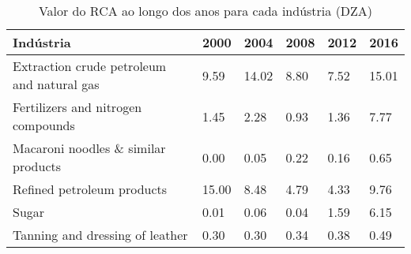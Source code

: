 \begin{table}
\centering
\caption{Valor do RCA ao longo dos anos para cada indústria (DZA)}
\begin{tabular}{p{6cm}p{1.5cm}p{1.5cm}p{1.5cm}p{1.5cm}p{1.5cm}}
\toprule
                                 Indústria &  2000 &  2004 & 2008 & 2012 &  2016 \\
\midrule
Extraction crude petroleum and natural gas &  9.59 & 14.02 & 8.80 & 7.52 & 15.01 \\
        Fertilizers and nitrogen compounds &  1.45 &  2.28 & 0.93 & 1.36 &  7.77 \\
       Macaroni noodles \& similar products &  0.00 &  0.05 & 0.22 & 0.16 &  0.65 \\
                Refined petroleum products & 15.00 &  8.48 & 4.79 & 4.33 &  9.76 \\
                                     Sugar &  0.01 &  0.06 & 0.04 & 1.59 &  6.15 \\
           Tanning and dressing of leather &  0.30 &  0.30 & 0.34 & 0.38 &  0.49 \\
\bottomrule
\end{tabular}
\end{table}
